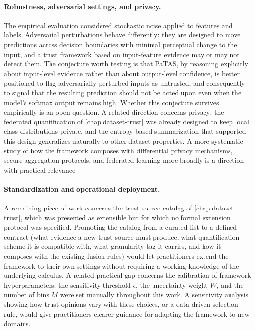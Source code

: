 \paragraph{Robustness, adversarial settings, and privacy.} The empirical evaluation considered stochastic noise applied to features and labels. Adversarial perturbations behave differently: they are designed to move predictions across decision boundaries with minimal perceptual change to the input, and a trust framework based on input-feature evidence may or may not detect them. The conjecture worth testing is that PaTAS, by reasoning explicitly about input-level evidence rather than about output-level confidence, is better positioned to flag adversarially perturbed inputs as untrusted, and consequently to signal that the resulting prediction should not be acted upon even when the model's softmax output remains high. Whether this conjecture survives empirically is an open question. A related direction concerns privacy: the federated quantification of \cref{chap:dataset-trust} was already designed to keep local class distributions private, and the entropy-based summarization that supported this design generalizes naturally to other dataset properties. A more systematic study of how the framework composes with differential privacy mechanisms, secure aggregation protocols, and federated learning more broadly is a direction with practical relevance.

\paragraph{Standardization and operational deployment.} A remaining piece of work concerns the trust-source catalog of \cref{chap:dataset-trust}, which was presented as extensible but for which no formal extension protocol was specified. Promoting the catalog from a curated list to a defined contract (what evidence a new trust source must produce, what quantification scheme it is compatible with, what granularity tag it carries, and how it composes with the existing fusion rules) would let practitioners extend the framework to their own settings without requiring a working knowledge of the underlying calculus. A related practical gap concerns the calibration of framework hyperparameters: the sensitivity threshold $\epsilon$, the uncertainty weight $W$, and the number of bins $M$ were set manually throughout this work. A sensitivity analysis showing how trust opinions vary with these choices, or a data-driven selection rule, would give practitioners clearer guidance for adapting the framework to new domains. 

